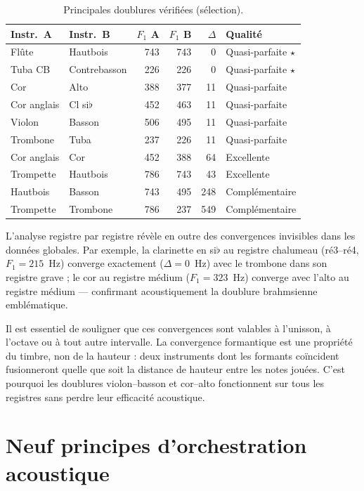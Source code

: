 \documentclass[12pt,a4paper]{article}
\begin{document}
\begin{table}[htbp]
\centering
\caption{Principales doublures vérifiées (sélection).}
\label{tab:doublings}
\begin{tabular}{llrrrl}
\toprule
Instr.~A & Instr.~B & $F_1$ A & $F_1$ B & $\Delta$ & Qualité \\
\midrule
Flûte & Hautbois & 743 & 743 & 0 & Quasi-parfaite $\star$ \\
Tuba CB & Contrebasson & 226 & 226 & 0 & Quasi-parfaite $\star$ \\
Cor & Alto & 388 & 377 & 11 & Quasi-parfaite \\
Cor anglais & Cl si$\flat$ & 452 & 463 & 11 & Quasi-parfaite \\
Violon & Basson & 506 & 495 & 11 & Quasi-parfaite \\
Trombone & Tuba & 237 & 226 & 11 & Quasi-parfaite \\
Cor anglais & Cor & 452 & 388 & 64 & Excellente \\
Trompette & Hautbois & 786 & 743 & 43 & Excellente \\
Hautbois & Basson & 743 & 495 & 248 & Complémentaire \\
Trompette & Trombone & 786 & 237 & 549 & Complémentaire \\
\bottomrule
\end{tabular}
\end{table}

L'analyse registre par registre révèle en outre des convergences invisibles dans les
données globales. Par exemple, la clarinette en si$\flat$ au registre chalumeau
(ré3--ré4, $F_1 = 215$~Hz) converge exactement ($\Delta = 0$~Hz) avec le trombone
dans son registre grave ; le cor au registre médium ($F_1 = 323$~Hz) converge avec
l'alto au registre médium --- confirmant acoustiquement la doublure brahmsienne emblématique.

Il est essentiel de souligner que ces convergences sont valables à l'unisson, à
l'octave ou à tout autre intervalle. La convergence formantique est une propriété du
timbre, non de la hauteur : deux instruments dont les formants coïncident fusionneront
quelle que soit la distance de hauteur entre les notes jouées. C'est pourquoi les
doublures violon--basson et cor--alto fonctionnent sur tous les registres sans perdre
leur efficacité acoustique.

\section{Neuf principes d'orchestration acoustique}
\label{sec:principles}
\end{document}
